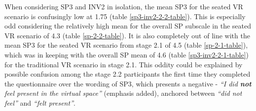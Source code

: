 When considering SP3 and INV2 in isolation, the mean SP3 for the seated VR scenario is confusingly low at 1.75 (table \ref{sp3-inv2-2-2-table}). This is especially odd considering the relatively high mean for the overall SP subscale in the seated VR scenario of 4.3 (table \ref{sp-2-2-table}). It is also completely out of line with the mean SP3 for the seated VR scenario from stage 2.1 of 4.5 (table \ref{sp-2-1-table}), which was in keeping with the overall SP mean of 4.6 (table \ref{sp3-inv2-2-1-table}) for the traditional VR scenario in stage 2.1. This oddity could be explained by possible confusion among the stage 2.2 participants the first time they completed the questionnaire over the wording of SP3, which presents a negative - \textit{``I did \textbf{not} feel present in the virtual space''} (emphasis added), anchored between \textit{``did not feel''} and \textit{``felt present''}.

